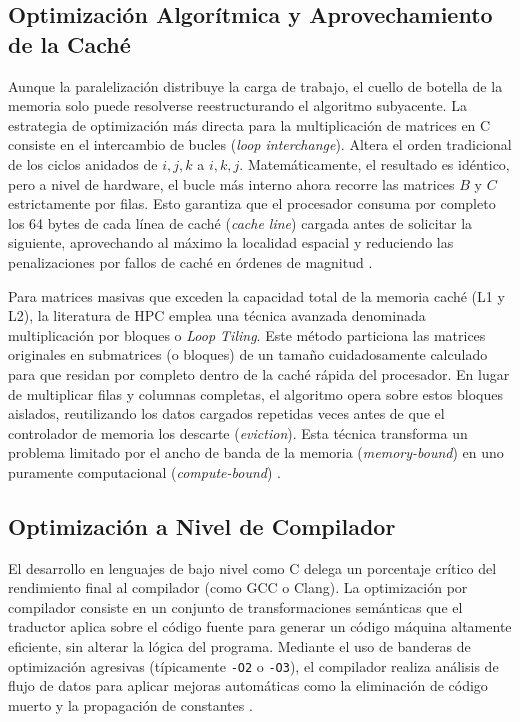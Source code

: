 \subsection{Optimización Algorítmica y Aprovechamiento de la Caché}
Aunque la paralelización distribuye la carga de trabajo, el cuello de botella de la memoria solo puede resolverse reestructurando el algoritmo subyacente. La estrategia de optimización más directa para la multiplicación de matrices en C consiste en el intercambio de bucles (\textit{loop interchange}). Altera el orden tradicional de los ciclos anidados de \(i, j, k\) a \(i, k, j\). Matemáticamente, el resultado es idéntico, pero a nivel de hardware, el bucle más interno ahora recorre las matrices \(B\) y \(C\) estrictamente por filas. Esto garantiza que el procesador consuma por completo los 64 bytes de cada línea de caché (\textit{cache line}) cargada antes de solicitar la siguiente, aprovechando al máximo la localidad espacial y reduciendo las penalizaciones por fallos de caché en órdenes de magnitud \parencite{Lam1991Cache}.

Para matrices masivas que exceden la capacidad total de la memoria caché (L1 y L2), la literatura de HPC emplea una técnica avanzada denominada multiplicación por bloques o \textit{Loop Tiling}. Este método particiona las matrices originales en submatrices (o bloques) de un tamaño cuidadosamente calculado para que residan por completo dentro de la caché rápida del procesador. En lugar de multiplicar filas y columnas completas, el algoritmo opera sobre estos bloques aislados, reutilizando los datos cargados repetidas veces antes de que el controlador de memoria los descarte (\textit{eviction}). Esta técnica transforma un problema limitado por el ancho de banda de la memoria (\textit{memory-bound}) en uno puramente computacional (\textit{compute-bound}) \parencite{Grama2003Introduction}.

\subsection{Optimización a Nivel de Compilador}
El desarrollo en lenguajes de bajo nivel como C delega un porcentaje crítico del rendimiento final al compilador (como GCC o Clang). La optimización por compilador consiste en un conjunto de transformaciones semánticas que el traductor aplica sobre el código fuente para generar un código máquina altamente eficiente, sin alterar la lógica del programa. Mediante el uso de banderas de optimización agresivas (típicamente \texttt{-O2} o \texttt{-O3}), el compilador realiza análisis de flujo de datos para aplicar mejoras automáticas como la eliminación de código muerto y la propagación de constantes \parencite{Allen2001Optimizing}.

